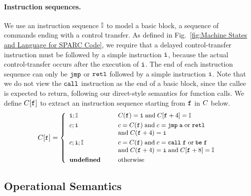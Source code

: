 \paragraph{\textbf{Instruction sequences.}}
We use an instruction sequence $\mathbb{I}$ to model
a basic block, \ie{} a sequence of commands ending
with a control transfer.
As defined in Fig.~\ref{fig:Machine States and Language for SPARC Code},
we require that a delayed control-transfer instruction
must be followed by  a simple instruction $\texttt{i}$,
because the actual control-transfer occurs after
the execution of $\texttt{i}$.
The end of each instruction sequence can only be
$\texttt{jmp}$ or $\texttt{retl}$  followed by a simple
instruction $\texttt{i}$.
Note that we do not view the $\texttt{call}$ instruction
as the end of a basic block, since the callee is
expected to return, following our direct-style
semantics for function calls.
We define $C[\texttt{f}_{}]$ to extract 
an instruction sequence starting 
from $\texttt{f}_{}$ in $C$ below.
\[
	\small
	C[\lab{}] =
	\left\{
		\begin{array}{ll}
			\simplins; \cblk &
			\quad \ \ \code(\lab{}) = \simplins \; 
				\text{and} \; \code[\lab{}+4] = \cblk \\
			
			\\[-8pt]
			
			\comm; \simplins &
			\quad \ \ 
				\comm = \code(\lab{}) \; \text{and} \; 
				\comm = \jmp \; \aexp \; \text{or} \; \retl
			\\ & \quad \ \ \text{and} \; C(\lab{}+4) = \simplins \\
			
			\\[-8pt]
			
			\comm; \simplins; \cblk &
			\quad \ \ \comm = \code(\lab{}) \; 
			\text{and} \; c = \call \; \lab{} \; \text{or} \; \be \; \lab{} \\
			& \quad \ \ \text{and} \; 
				\code(\lab{}+4) = \simplins \; \text{and} \;
				\code[\lab{}+8] = \cblk \\
			
			\\[-8pt]
			
			\undef & \quad \ \ \text{otherwise}
		\end{array}
	\right.
\]

\subsection{Operational Semantics}
\label{subsec : Operational Semantics}

